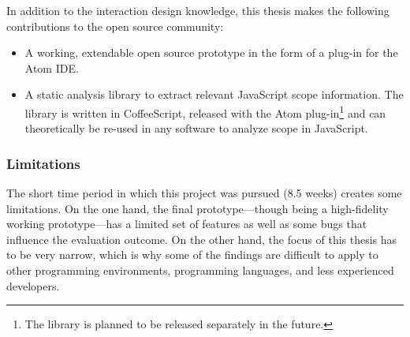 In addition to the interaction design knowledge, this thesis makes the
following contributions to the open source community:

\begin{itemize}
\itemsep1pt\parskip0pt
\item
  A working, extendable open source prototype in the form of a plug-in
  for the Atom IDE.
\item
  A static analysis library to extract relevant JavaScript scope
  information. The library is written in CoffeeScript, released with the
  Atom
  plug-in\footnote{The library is planned to be released separately in the future.}
  and can theoretically be re-used in any software to analyze scope in
  JavaScript.
\end{itemize}

\subsubsection{Limitations}\label{limitations}

The short time period in which this project was pursued (8.5 weeks)
creates some limitations. On the one hand, the final prototype—though
being a high-fidelity working prototype—has a limited set of features as
well as some bugs that influence the evaluation outcome. On the other
hand, the focus of this thesis has to be very narrow, which is why some
of the findings are difficult to apply to other programming
environments, programming languages, and less experienced developers.
